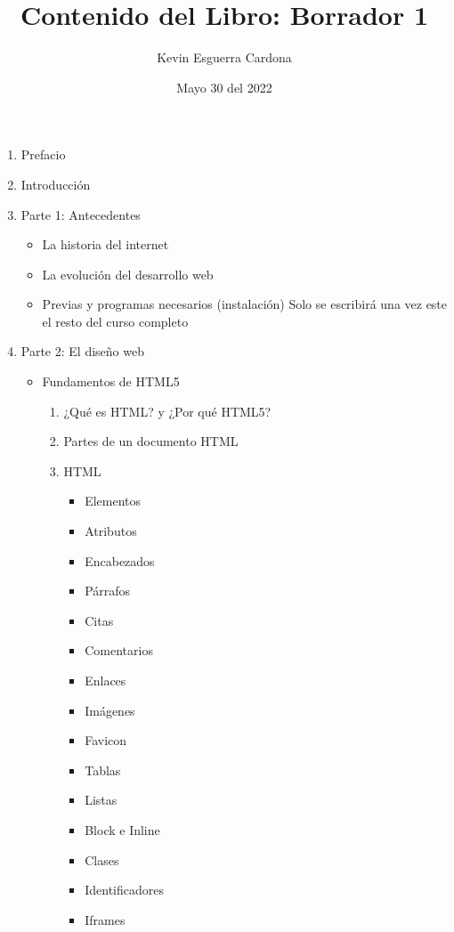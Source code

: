 \documentclass[12pt, letterpaper]{article}
\title{Contenido del Libro: Borrador 1}
\author{Kevin  Esguerra Cardona}
\date{Mayo 30 del 2022}
\begin{document}
\maketitle

\begin{enumerate}
    \item Prefacio
    \item Introducción
    \item Parte 1: Antecedentes
    \begin{itemize}
        \item La historia del internet
        \item La evolución del desarrollo web
        \item Previas y programas necesarios (instalación) \newline*Solo se escribirá  una vez este el resto del curso completo
    \end{itemize}
    \item Parte 2: El diseño web
    \begin{itemize}
        \item Fundamentos de HTML5
        \begin{enumerate}
            \item ¿Qué es HTML? y ¿Por qué HTML5?
            \item Partes de un documento HTML
            \item HTML
            \begin{itemize}
                \item Elementos
                \item Atributos
                \item Encabezados
                \item Párrafos
                \item Citas
                \item Comentarios
                \item Enlaces
                \item Imágenes
                \item Favicon
                \item Tablas
                \item Listas
                \item Block e Inline
                \item Clases
                \item Identificadores
                \item Iframes

\end{itemize}
\end{enumerate}
\end{itemize}
\end{enumerate}
\end{document}
